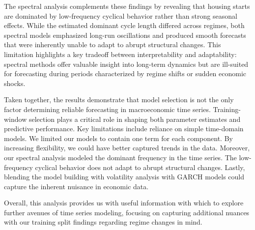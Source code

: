 \documentclass[10pt,twocolumn,letterpaper]{article}
\begin{document}
The spectral analysis complements these findings by revealing that housing starts are dominated by low-frequency cyclical behavior rather than strong seasonal effects. While the estimated dominant cycle length differed across regimes, both spectral models emphasized long-run oscillations and produced smooth forecasts that were inherently unable to adapt to abrupt structural changes. This limitation highlights a key tradeoff between interpretability and adaptability: spectral methods offer valuable insight into long-term dynamics but are ill-suited for forecasting during periods characterized by regime shifts or sudden economic shocks.

Taken together, the results demonstrate that model selection is not the only factor determining reliable forecasting in macroeconomic time series. Training-window selection plays a critical role in shaping both parameter estimates and predictive performance. Key limitations include reliance on simple time-domain models. We limited our models to contain one term for each component. By increasing flexibility, we could have better captured trends in the data. Moreover, our spectral analysis modeled the dominant frequency in the time series. The low-frequency cyclical behavior does not adapt to abrupt structural changes. Lastly, blending the model building with volatility analysis with GARCH models could capture the inherent nuisance in economic data.

Overall, this analysis provides us with useful information with which to explore further avenues of time series modeling, focusing on capturing additional nuances with our training split findings regarding regime changes in mind.



{\small

}
\end{document}

